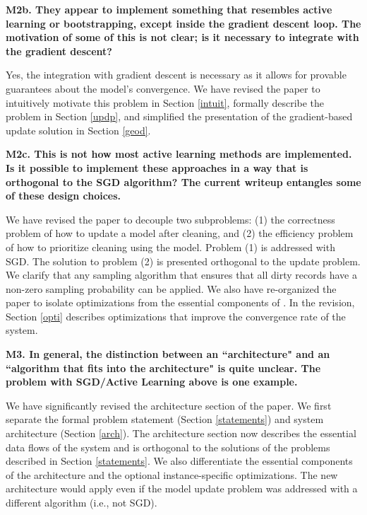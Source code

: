 \noindent \textbf{M2b. They appear to implement something that resembles active learning or bootstrapping, except inside the gradient descent loop. The motivation of some of this is not clear; is it necessary to integrate with the gradient descent?} 

Yes, the integration with gradient descent is necessary as it allows for provable guarantees about the model's convergence.
We have revised the paper to intuitively motivate this problem in Section \ref{intuit}, formally describe the problem in Section \ref{updp}, and simplified the presentation of the gradient-based update solution in Section \ref{geod}.

\vspace{0.5em}

\noindent\textbf{M2c. This is not how most active learning methods are implemented. Is it possible to implement these approaches in a way that is orthogonal to the SGD algorithm? The current writeup entangles some of these design choices.} 

We have revised the paper to decouple two subproblems: (1) the correctness problem of how to update a model after cleaning, and (2) the efficiency problem of how to prioritize cleaning using the model. 
Problem (1) is addressed with SGD.
The solution to problem (2) is presented orthogonal to the update problem.
We clarify that any sampling algorithm that ensures that all dirty records have a non-zero sampling probability can be applied.
We also have re-organized the paper to isolate optimizations from the essential components of \sys.
In the revision, Section \ref{opti} describes optimizations that improve the convergence rate of the system.

\vspace{0.5em}

\noindent\textbf{M3. In general, the distinction between an ``architecture" and an ``algorithm that fits into the architecture" is quite unclear. The problem with SGD/Active Learning above is one example.}

We have significantly revised the architecture section of the paper.
We first separate the formal problem statement (Section \ref{statements}) and system architecture (Section \ref{arch}).
The architecture section now describes the essential data flows of the system and is orthogonal to the solutions of the problems described in Section \ref{statements}.
We also differentiate the essential components of the architecture and the optional instance-specific optimizations.
The new architecture would apply even if the model update problem was addressed with a different algorithm (i.e., not SGD).

